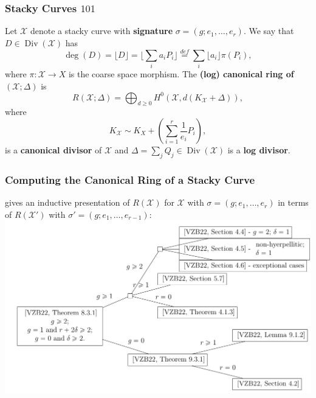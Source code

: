 \documentclass[handout]{beamer}
\numberwithin{equation}{section}
\numberwithin{case}{theorem}
\newcommand{\sX}{\mathscr{X}}		%
\newcommand{\floor}[1]{\lfloor #1 \rfloor}
\newcommand{\<}{\left\langle}
\renewcommand{\>}{\right\rangle}
\begin{document}
	\begin{frame}
		\frametitle{Stacky Curves $101$}		
			Let $\sX$ denote a stacky curve with \textbf{signature} $\sigma=(g;e_1,\ldots, e_r).$ \pause
			We say that $D\in \operatorname{Div}(\sX)$ has
			\[\deg(D)=\lfloor D\rfloor=\Big\lfloor\sum_ia_iP_i\Big\rfloor\overset{def}{=}\sum_i \floor{a_i}\pi(P_i),\]
			where $\pi:\sX\to X$ is the coarse space morphism. \pause The \textbf{(log) canonical ring of $(\sX; \Delta)$} is 
			\[R(\sX;\Delta)=\bigoplus_{d\geq 0} H^0(\sX,d(K_{\sX}+\Delta)),\]
			where \[K_{\sX}\sim K_X+\left(\sum_{i=1}^r \frac{1}{e_i}P_i\right),\] is a \textbf{canonical divisor} of $\sX$ and $\Delta=\sum_jQ_j\in \operatorname{Div}(\sX)$ is a \textbf{log divisor}. 
	\end{frame}	
	
	\begin{frame}
		\frametitle{Computing the Canonical Ring of a Stacky Curve}
		\cite{VZB} gives an inductive presentation of $R(\sX)$ for $\sX$ with $\sigma=(g;e_1,\ldots, e_r)$ in terms of $R(\sX')$ with $\sigma'=(g;e_1,\ldots, e_{r-1})$: \pause
		\includegraphics[scale=0.5]{VZB.png}
	\end{frame}
	
\end{document}
